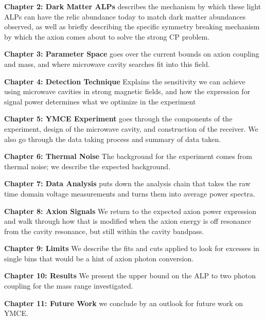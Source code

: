 \documentclass[11pt]{book}
\begin{document}
\textbf{Chapter 2: Dark Matter ALPs} describes the mechanism by which these light ALPs can have the relic abundance today to match dark matter abundances observed, as well as briefly describing the specific symmetry breaking mechanism by which the axion comes about to solve the strong CP problem.

\textbf{Chapter 3: Parameter Space} goes over the current bounds on axion coupling and mass, and where microwave cavity searches fit into this field.

\textbf{Chapter 4: Detection Technique} Explains the sensitivity we can achieve using microwave cavities in strong magnetic fields, and how the expression for signal power determines what we optimize in the experiment

\textbf{Chapter 5: YMCE Experiment} goes through the components of the experiment, design of the microwave cavity, and construction of the receiver. We also go through the data taking process and summary of data taken.

\textbf{Chapter 6: Thermal Noise} The background for the experiment comes from thermal noise; we describe the expected background.

\textbf{Chapter 7: Data Analysis} puts down the analysis chain that takes the raw time domain voltage measurements and turns them into average power spectra. 

\textbf{Chapter 8: Axion Signals} We return to the expected axion power expression and walk through how that is modified when the axion energy is off resonance from the cavity resonance, but still within the cavity bandpass.

\textbf{Chapter 9:  Limits} We describe the fits and cuts applied to look for excesses in single bins that would be a hint of axion photon conversion.

\textbf{Chapter 10: Results} We present the upper bound on the ALP to two photon coupling for the mass range investigated.

\textbf{Chapter 11: Future Work} we conclude by an outlook for future work on YMCE.
\end{document}
